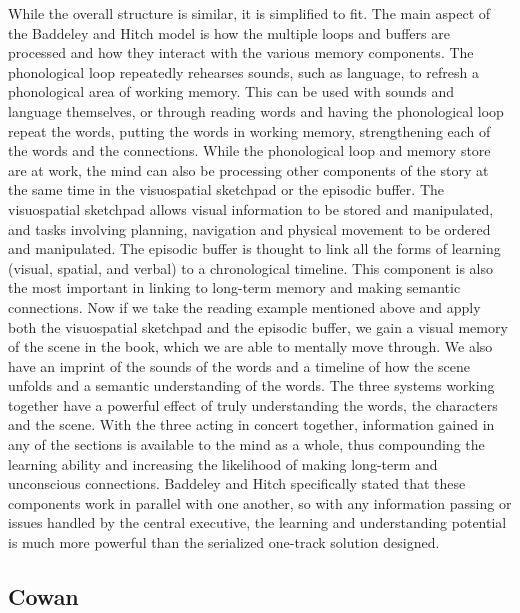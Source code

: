 While the overall structure is similar, it is simplified to fit.  The main
aspect of the Baddeley and Hitch model is how the multiple loops and buffers are
processed and how they interact with the various memory components.  The
phonological loop repeatedly rehearses sounds, such as language, to refresh a
phonological area of working memory.  This can be used with sounds and language
themselves, or through reading words and having the phonological loop repeat the
words, putting the words in working memory, strengthening each of the words and
the connections.  While the phonological loop and memory store
are at work, the mind can also be processing other components of the story at
the same time in the visuospatial sketchpad or the episodic buffer. The
visuospatial sketchpad allows visual information to be stored and manipulated,
and tasks involving planning, navigation and physical movement to be ordered and
manipulated.  The episodic buffer is thought to link all the forms of learning
(visual, spatial, and verbal) to a chronological timeline.  This component is also
the most important in linking to long-term memory and making semantic
connections.  Now if we take the reading example mentioned above and apply both
the visuospatial sketchpad and the episodic buffer, we gain a visual memory of
the scene in the book, which we are able to mentally move through.  We also have
an imprint of the sounds of the words and a timeline of how the scene unfolds
and a semantic understanding of the words.  The three systems working together
have a powerful effect of truly understanding the words, the characters and the
scene. With the three acting in concert together, information gained in any of
the sections is available to the mind as a whole, thus compounding the learning
ability and increasing the likelihood of making long-term and unconscious
connections.  Baddeley and Hitch specifically stated that these components
work in parallel with one another, so with any information passing or issues
handled by the central executive, the learning and understanding potential is
much more powerful than the serialized one-track solution designed.

\subsection{Cowan}

